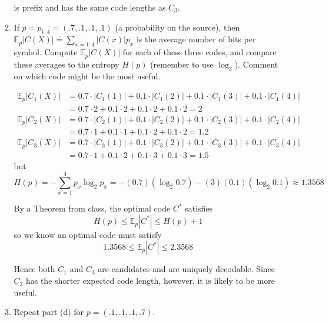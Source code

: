 \documentclass[11pt]{report}
\newcommand{\E}{\mathbb{E}}
\newcommand{\abs}[1]{\left\vert #1 \right\vert}
\begin{document}
\begin{enumerate}[1.]
\begin{enumerate}
                    is prefix and has the same code lengths as $C_3$.
                    \color{black}

              \item If $p=p_{1:4}=(.7,.1,.1,.1)$ (a probability on the source), then
                    $\mathbb{E}_p|C(X)| \doteq \sum_{x=1:4} |C(x)|p_x$ is the average number of bits per symbol. Compute $\mathbb{E}_p|C(X)|$ for each of these three codes, and compare these averages to the entropy $H(p)$ (remember to use $\log_2$). Comment on which code might be the most useful.

                    \color{blue}
                    \begin{align*}
                        \E_p\abs{C_1(X)} & = 0.7\cdot \abs{C_1(1)} + 0.1\cdot \abs{C_1(2)} + 0.1\cdot \abs{C_1(3)} + 0.1\cdot \abs{C_1(4)} \\
                                         & = 0.7\cdot 2 + 0.1\cdot 2 + 0.1\cdot 2 + 0.1\cdot 2 = \boxed{2}                                 \\
                        \E_p\abs{C_2(X)} & = 0.7\cdot \abs{C_2(1)} + 0.1\cdot \abs{C_2(2)} + 0.1\cdot \abs{C_2(3)} + 0.1\cdot \abs{C_2(4)} \\
                                         & = 0.7\cdot 1 + 0.1\cdot 1 + 0.1\cdot 2 + 0.1\cdot 2 = \boxed{1.2}                               \\
                        \E_p\abs{C_3(X)} & = 0.7\cdot \abs{C_3(1)} + 0.1\cdot \abs{C_3(2)} + 0.1\cdot \abs{C_3(3)} + 0.1\cdot \abs{C_3(4)} \\
                                         & = 0.7 \cdot 1 + 0.1\cdot 2 + 0.1\cdot 3 + 0.1\cdot 3 = \boxed{1.5}
                    \end{align*}
                    but
                    \[H(p) = -\sum_{x=1}^4 p_x \log_2 p_x = - (0.7)(\log_2 0.7) - (3)(0.1)(\log_2 0.1) \approx 1.3568\]

                    By a Theorem from class, the optimal code $C^*$ satisfies
                    \[H(p) \leq \E_p \abs{C^*} \leq H(p) + 1\]
                    so we know an optimal code must satisfy
                    \[1.3568 \leq \E_p \abs{C^*} \leq 2.3568\]

                    Hence both $C_1$ and $C_3$ are candidates and are uniquely decodable. Since $C_3$ has the shorter expected code length, however, it is likely to be more useful.
                    \color{black}

              \item Repeat part (d) for $p=(.1,.1,.1,.7)$.


\end{enumerate}
\end{enumerate}
\end{document}
